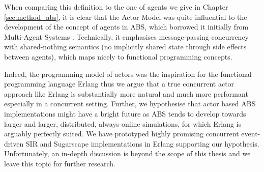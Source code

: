 When comparing this definition to the one of agents we give in Chapter \ref{sec:method_abs}, it is clear that the Actor Model was quite influential to the development of the concept of agents in ABS, which borrowed it initially from Multi-Agent Systems \cite{wooldridge_introduction_2009}. Technically, it emphasises message-passing concurrency with shared-nothing semantics (no implicitly shared state through side effects between agents), which maps nicely to functional programming concepts.

Indeed, the programming model of actors \cite{agha_actors:_1986} was the inspiration for the functional programming language Erlang thus we argue that a true concurrent actor approach like Erlang is substantially more natural and much more performant especially in a concurrent setting. Further, we hypothesise that actor based ABS implementations might have a bright future as ABS tends to develop towards larger and larger, distributed, always-online simulations, for which Erlang is arguably perfectly suited. We have prototyped highly promising concurrent event-driven SIR and Sugarscape implementations in Erlang supporting our hypothesis. Unfortunately, an in-depth discussion is beyond the scope of this thesis and we leave this topic for further research.



%
